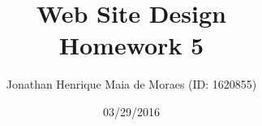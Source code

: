 \title{Web Site Design \\ Homework 5}
\author{Jonathan Henrique Maia de Moraes (ID: 1620855)}
\date{03/29/2016}
\maketitle

